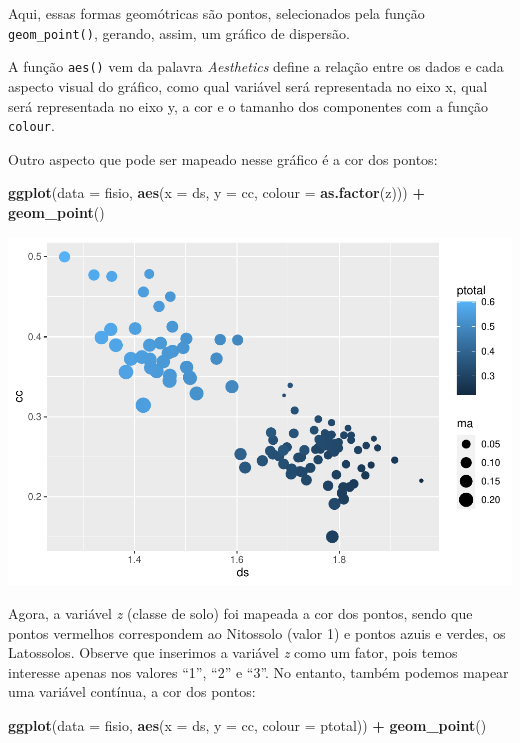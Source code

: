 \documentclass[
]{book}
\newenvironment{Shaded}{\begin{snugshade}}{\end{snugshade}}
\newcommand{\DataTypeTok}[1]{\textcolor[rgb]{0.13,0.29,0.53}{#1}}
\newcommand{\KeywordTok}[1]{\textcolor[rgb]{0.13,0.29,0.53}{\textbf{#1}}}
\newcommand{\NormalTok}[1]{#1}
\newcommand{\OperatorTok}[1]{\textcolor[rgb]{0.81,0.36,0.00}{\textbf{#1}}}
\newcommand{\StringTok}[1]{\textcolor[rgb]{0.31,0.60,0.02}{#1}}
\begin{document}
Aqui, essas formas geomótricas são pontos, selecionados pela função \texttt{geom\_point()}, gerando, assim, um gráfico de dispersão.

A função \texttt{aes()} vem da palavra \emph{Aesthetics} define a relação entre os dados e cada aspecto visual do gráfico, como qual variável será representada no eixo x, qual será representada no eixo y, a cor e o tamanho dos componentes com a função \texttt{colour}.

Outro aspecto que pode ser mapeado nesse gráfico é a cor dos pontos:

\begin{Shaded}
\begin{Highlighting}[]
\KeywordTok{ggplot}\NormalTok{(}\DataTypeTok{data =}\NormalTok{ fisio, }\KeywordTok{aes}\NormalTok{(}\DataTypeTok{x =}\NormalTok{ ds, }\DataTypeTok{y =}\NormalTok{ cc, }\DataTypeTok{colour =} \KeywordTok{as.factor}\NormalTok{(z))) }\OperatorTok{+}
\StringTok{  }\KeywordTok{geom_point}\NormalTok{()}
\end{Highlighting}
\end{Shaded}

\includegraphics{TudodoR_files/figure-latex/unnamed-chunk-189-1.pdf}

Agora, a variável \emph{z} (classe de solo) foi mapeada a cor dos pontos, sendo que pontos vermelhos correspondem ao Nitossolo (valor 1) e pontos azuis e verdes, os Latossolos. Observe que inserimos a variável \emph{z} como um fator, pois temos interesse apenas nos valores ``1'', ``2'' e ``3''. No entanto, também podemos mapear uma variável contínua, a cor dos pontos:

\begin{Shaded}
\begin{Highlighting}[]
\KeywordTok{ggplot}\NormalTok{(}\DataTypeTok{data =}\NormalTok{ fisio, }\KeywordTok{aes}\NormalTok{(}\DataTypeTok{x =}\NormalTok{ ds, }\DataTypeTok{y =}\NormalTok{ cc, }\DataTypeTok{colour =}\NormalTok{ ptotal)) }\OperatorTok{+}
\StringTok{  }\KeywordTok{geom_point}\NormalTok{()}
\end{Highlighting}
\end{Shaded}
\end{document}
